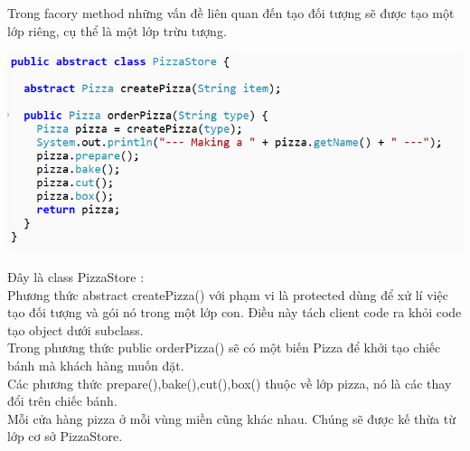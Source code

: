 Trong facory method những vấn đề liên quan đến tạo đối tượng sẽ được tạo một lớp riêng, cụ thể là một lớp trừu tượng.\\

\begin{center}
	\includegraphics[width=1\columnwidth]{GALLEYS/images/chapter5/images1}
\end{center}
Đây là class PizzaStore :\\

Phương thức abstract createPizza() với phạm vi là protected dùng để xử lí việc tạo đối tượng và gói nó trong một lớp con. Điều này tách client code ra khỏi code tạo object dưới subclass.\\

Trong phương thức public orderPizza() sẽ có một biến Pizza để khởi tạo chiếc bánh mà khách hàng muốn đặt.\\

Các phương thức prepare(),bake(),cut(),box() thuộc về lớp pizza, nó là các thay đổi trên chiếc bánh.\\

Mỗi cửa hàng pizza ở mỗi vùng miền cũng khác nhau. Chúng sẽ được kế thừa từ lớp cơ sở PizzaStore.\\

